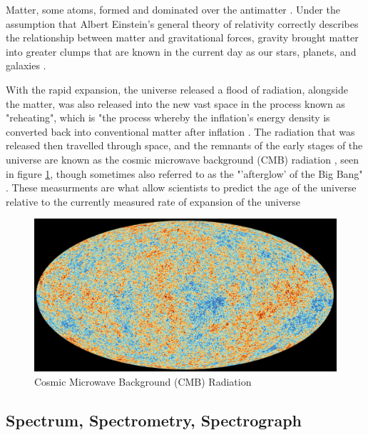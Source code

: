 \documentclass[12pt]{article}
\begin{document}
Matter, some atoms, formed \cite{hubblebigbang} and dominated over the antimatter \cite{britbigbang}.
Under the assumption that Albert Einstein's general theory of relativity correctly describes the relationship between matter and gravitational forces,
gravity brought matter into greater clumps that are known in the current day as our stars, planets, and galaxies
\cite{hubblebigbang}.

With the rapid expansion, the universe released a flood of radiation, alongside the matter, was also released into the new vast space
\cite{britbigbang,spacebigbang}
in the process known as "reheating", which is "the process whereby the inflation's energy density is converted back
into conventional matter after inflation
\cite{reheating}.
The radiation that was released then travelled through space, and the remnants of the early stages of the universe are known
as the cosmic microwave background (CMB) radiation \cite{britbigbang}, seen in figure \ref{fig:cmb}, 
though sometimes also referred to as the "'afterglow' of the Big Bang"
\cite{spacebigbang}.
These measurments are what allow scientists to predict the age of the universe relative to the currently measured rate of expansion of the universe
\cite{hubblebigbang}

\begin{figure} [H]
    \centering
    \includegraphics[width=\textwidth]{cmb.jpg}
    \caption{\centering \footnotesize{Cosmic Microwave Background (CMB) Radiation \protect\cite{cmbpic}}}
    \label{fig:cmb}
\end{figure}

\subsection{Spectrum, Spectrometry, Spectrograph} \label{sec:1.2}
\end{document}
